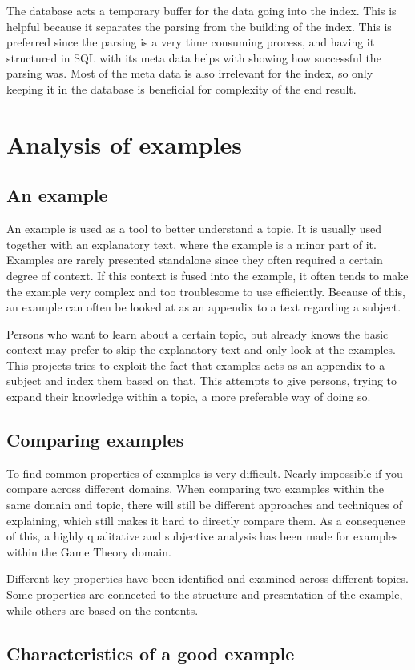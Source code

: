 The database acts a temporary buffer for the data going into the index. This is helpful because it separates the parsing from the building of the index. This is preferred since the parsing is a very time consuming process, and having it structured in SQL with its meta data helps with showing how successful the parsing was. Most of the meta data is also irrelevant for the index, so only keeping it in the database is beneficial for complexity of the end result.



\section{Analysis of examples}

\subsection{An example}

An example is used as a tool to better understand a topic. It is usually used together with an explanatory text, where the example is a minor part of it. Examples are rarely presented standalone since they often required a certain degree of context. If this context is fused into the example, it often tends to make the example very complex and too troublesome to use efficiently. Because of this, an example can often be looked at as an appendix to a text regarding a subject. 


Persons who want to learn about a certain topic, but already knows the basic context may prefer to skip the explanatory text and only look at the examples. This projects tries to exploit the fact that examples acts as an appendix to a subject and index them based on that. This attempts to give persons, trying to expand their knowledge within a topic, a more preferable way of doing so.

\subsection{Comparing examples}

To find common properties of examples is very difficult. Nearly impossible if you compare across different domains. When comparing two examples within the same domain and topic, there will still be different approaches and techniques of explaining, which still makes it hard to directly compare them. As a consequence of this, a highly qualitative and subjective analysis has been made for examples within the Game Theory domain. 

Different key properties have been identified and examined across different topics. Some properties are connected to the structure and presentation of the example, while others are based on the contents. 


\subsection{Characteristics of a good example}


\cleardoublepage